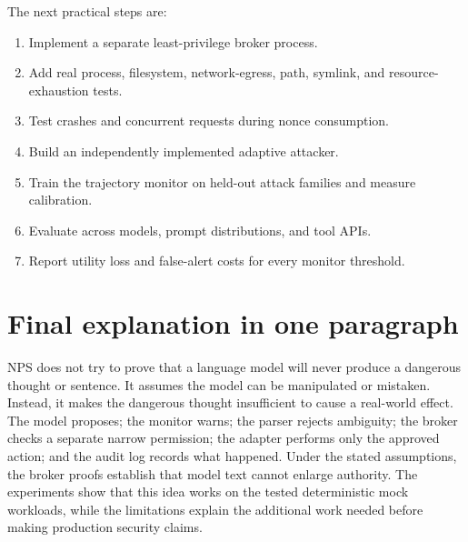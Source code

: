 \documentclass[11pt]{article}
\begin{document}
The next practical steps are:
\begin{enumerate}
  \item Implement a separate least-privilege broker process.
  \item Add real process, filesystem, network-egress, path, symlink, and resource-exhaustion tests.
  \item Test crashes and concurrent requests during nonce consumption.
  \item Build an independently implemented adaptive attacker.
  \item Train the trajectory monitor on held-out attack families and measure calibration.
  \item Evaluate across models, prompt distributions, and tool APIs.
  \item Report utility loss and false-alert costs for every monitor threshold.
\end{enumerate}

\section{Final explanation in one paragraph}

NPS does not try to prove that a language model will never produce a dangerous thought or sentence. It assumes the model can be manipulated or mistaken. Instead, it makes the dangerous thought insufficient to cause a real-world effect. The model proposes; the monitor warns; the parser rejects ambiguity; the broker checks a separate narrow permission; the adapter performs only the approved action; and the audit log records what happened. Under the stated assumptions, the broker proofs establish that model text cannot enlarge authority. The experiments show that this idea works on the tested deterministic mock workloads, while the limitations explain the additional work needed before making production security claims.
\end{document}
